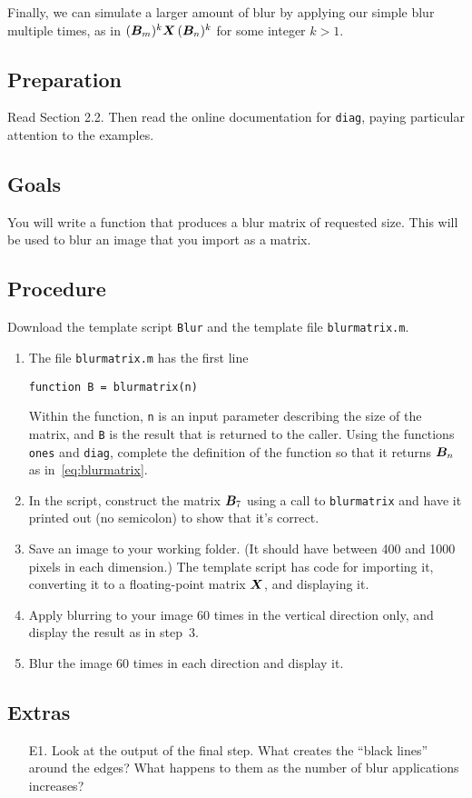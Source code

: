 \documentclass[11pt,twoside]{article}
\begin{document}
Finally, we can simulate a larger amount of blur by applying our simple blur multiple times, as in $ (\bm{B}_m)^k \bm{X} \, (\bm{B}_n)^k$ for some integer $k>1$. 

\subsection*{Preparation}

Read Section 2.2. Then read the online documentation for \texttt{diag}, paying particular attention to the examples. 


\subsection*{Goals}

You will write a function that produces a blur matrix of requested size. This will be used to blur an image that you import as a matrix.


\subsection*{Procedure}

Download the template script \texttt{Blur} and the template file \texttt{blurmatrix.m}.

\begin{enumerate}
\item The file \texttt{blurmatrix.m} has the first line
\begin{verbatim}
function B = blurmatrix(n)
\end{verbatim}
Within the function, \texttt{n} is an input parameter describing the size of the matrix, and \texttt{B} is the result that is returned to the caller. Using the functions \texttt{ones} and \texttt{diag}, complete the definition of the function so that it returns $\bm{B}_n$ as in~\eqref{eq:blurmatrix}.
\item In the script, construct the matrix $\bm{B}_7$ using a call to \texttt{blurmatrix} and have it printed out (no semicolon) to show that it's correct.
\item Save an image to your working folder. (It should have between 400 and 1000 pixels in each dimension.) The template script has code for importing it, converting it to a floating-point matrix $\bm{X}$, and displaying it. 
\item Apply blurring to your image 60 times in the vertical direction only, and display the result as in step~3.  
\item Blur the image 60 times in each direction and display it. 
\end{enumerate}

\subsection*{Extras}
\begin{enumerate}
\item[E1.] Look at the output of the final step. What creates the ``black lines'' around the edges? What happens to them as the number of blur applications increases? 
\end{enumerate}
\end{document}
